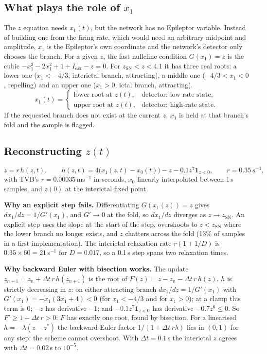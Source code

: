 \documentclass[11pt]{article}
\newcommand{\zsn}{z_{\mathrm{SN}}}
\begin{document}
\subsection{What plays the role of $x_1$}
The $z$ equation needs $x_1(t)$, but the network has no Epileptor variable. Instead of building one from the firing rate,
which would need an arbitrary midpoint and amplitude, $x_1$ is the Epileptor's own coordinate and the network's
detector only chooses the branch. For a given $z$, the fast nullcline condition $G(x_1)=z$ is the cubic
$-x_1^3 - 2x_1^2 + 1 + I_{ext} - z = 0$. For $\zsn < z < 4.1$ it has three real roots: a lower one ($x_1<-4/3$, interictal
branch, attracting), a middle one ($-4/3<x_1<0$, repelling) and an upper one ($x_1>0$, ictal branch, attracting).
\[
x_1(t) = \begin{cases} \text{lower root at } z(t), & \text{detector: low-rate state},\\
\text{upper root at } z(t), & \text{detector: high-rate state.}\end{cases}
\]
If the requested branch does not exist at the current $z$, $x_1$ is held at that branch's fold and the sample is flagged.

\subsection{Reconstructing $z(t)$}\label{sec:zint}
\[
\dot z = r\,h(z,t),\qquad h(z,t) = 4\big(x_1(z,t) - x_0(t)\big) - z - 0.1 z^7\mathbf 1_{z<0},\qquad r = 0.35\ \mathrm{s}^{-1},
\]
with TVB's $r=0.00035$\,ms$^{-1}$ in seconds, $x_0$ linearly interpolated between 1\,s samples, and $z(0)$ at the
interictal fixed point.

\textbf{Why an explicit step fails.} Differentiating $G(x_1(z)) = z$ gives $dx_1/dz = 1/G'(x_1)$, and $G'\to0$ at the fold,
so $dx_1/dz$ diverges as $z\to\zsn$. An explicit step uses the slope at the start of the step, overshoots to $z<\zsn$ where
the lower branch no longer exists, and $z$ chatters across the fold (13\% of samples in a first implementation). The
interictal relaxation rate $r(1+1/D)$ is $0.35\times60 = 21$\,s$^{-1}$ for $D = 0.017$, so a 0.1\,s step spans two
relaxation times.

\textbf{Why backward Euler with bisection works.} The update $z_{n+1} = z_n + \Delta t\,r\,h(z_{n+1})$ is the root of
$F(z) = z - z_n - \Delta t\,r\,h(z)$. $h$ is strictly decreasing in $z$: on either attracting branch $dx_1/dz = 1/G'(x_1)$ with
$G'(x_1) = -x_1(3x_1+4) < 0$ (for $x_1<-4/3$ and for $x_1>0$); at a clamp this term is 0; $-z$ has derivative $-1$; and
$-0.1z^7\mathbf 1_{z<0}$ has derivative $-0.7z^6\le0$. So $F'\ge1+\Delta t\,r>0$: $F$ has exactly one root, found by
bisection. For a linearised $h=-\lambda(z-z^*)$ the backward-Euler factor $1/(1+\Delta t\,r\lambda)$ lies in $(0,1)$ for any
step: the scheme cannot overshoot. With $\Delta t = 0.1$\,s the interictal $z$ agrees with $\Delta t = 0.02$\,s to $10^{-5}$.
\end{document}
